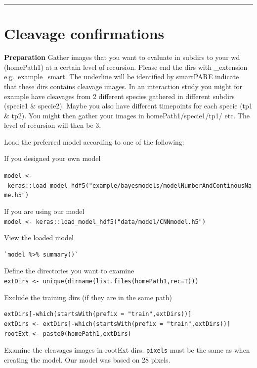 \documentclass[
]{article}
\begin{document}
\begin{center}\rule{0.5\linewidth}{0.5pt}\end{center}

\hypertarget{cleavage-confirmations}{%
\section{Cleavage confirmations}\label{cleavage-confirmations}}

\textbf{Preparation} Gather images that you want to evaluate in subdirs
to your wd (homePath1) at a certain level of recursion. Please end the
dirs with \_extension e.g.~example\_smart. The underline will be
identified by smartPARE indicate that these dirs contains cleavage
images. In an interaction study you might for example have cleavages
from 2 different species gathered in different subdirs (specie1 \&
specie2). Maybe you also have different timepoints for each specie (tp1
\& tp2). You might then gather your images in homePath1/specie1/tp1/
etc. The level of recursion will then be 3.

Load the preferred model according to one of the following:

If you designed your own model

\texttt{model\ \textless{}-\ keras::load\_model\_hdf5("example/bayesmodels/modelNumberAndContinousName.h5")}

If you are using our model\\
\texttt{model\ \textless{}-\ keras::load\_model\_hdf5("data/model/CNNmodel.h5")}

View the loaded model

\begin{verbatim}
`model %>% summary()` 
\end{verbatim}

Define the directories you want to examine\\
\texttt{extDirs\ \textless{}-\ unique(dirname(list.files(homePath1,rec=T)))}

Exclude the training dirs (if they are in the same path)

\begin{verbatim}
extDirs[-which(startsWith(prefix = "train",extDirs))]  
extDirs <- extDirs[-which(startsWith(prefix = "train",extDirs))]  
rootExt <- paste0(homePath1,extDirs)
\end{verbatim}

Examine the cleavages images in rootExt dirs. \texttt{pixels} must be
the same as when creating the model. Our model was based on 28 pixels.
\end{document}
